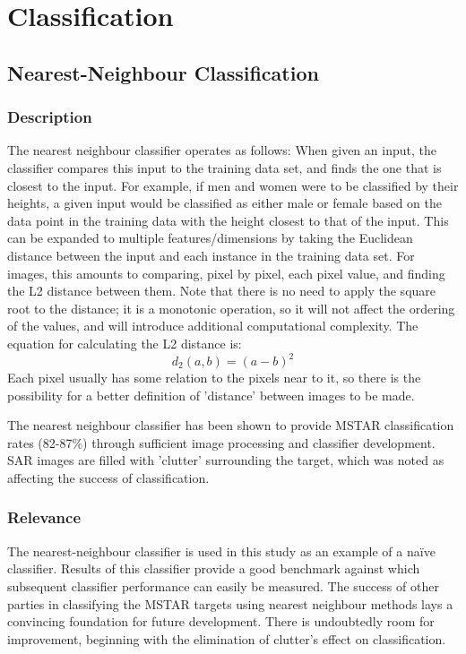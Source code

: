 \section{Classification}


\subsection{Nearest-Neighbour Classification}\label{lit:nn}
\subsubsection{Description}
The nearest neighbour classifier operates as follows:
When given an input, the classifier compares this input to the training data set, and finds the one that is closest to the input. For example, if men and women were to be classified by their heights, a given input would be classified as either male or female based on the data point in the training data with the height closest to that of the input. This can be expanded to multiple features/dimensions by taking the Euclidean distance between the input and each instance in the training data set. For images, this amounts to comparing, pixel by pixel, each pixel value, and finding the L2 distance between them. Note that there is no need to apply the square root to the distance; it is a monotonic operation, so it will not affect the ordering of the values, and will introduce additional computational complexity. The equation for calculating the L2 distance is:
\[ d_2(a,b) = (a - b)^2  \]
 Each pixel usually has some relation to the pixels near to it, so there is the possibility for a better definition of 'distance' between images to be made\cite{IMED, Michie94machinelearning}.
 
The nearest neighbour classifier has been shown to provide MSTAR classification rates (82-87\%) through sufficient image processing and classifier development. SAR images are filled with 'clutter' surrounding the target, which was noted as affecting the success of classification\cite{Schumacher_atrof}.

\subsubsection{Relevance}
The nearest-neighbour classifier is used in this study as an example of a na{\"i}ve classifier. Results of this classifier provide a good benchmark against which subsequent classifier performance can easily be measured. The success of other parties in classifying the MSTAR targets using nearest neighbour methods lays a convincing foundation for future development. There is undoubtedly room for improvement, beginning with the elimination of clutter's effect on classification.

